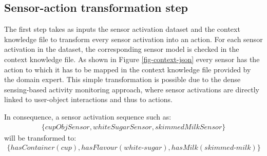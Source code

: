 

\subsection{Sensor-action transformation step}
\label{subsec:clustering:sa3:transform}

The first step takes as inputs the sensor activation dataset and the context knowledge file to transform every sensor activation into an action. For each sensor activation in the dataset, the corresponding sensor model is checked in the context knowledge file. As shown in Figure \ref{fig-context-json} every sensor has the action to which it has to be mapped in the context knowledge file provided by the domain expert. This simple transformation is possible due to the dense sensing-based activity monitoring approach, where sensor activations are directly linked to user-object interactions and thus to actions. 

In consequence, a sensor activation sequence such as:
 \begin{equation*}
 \begin{split}
   \{cupObjSensor, whiteSugarSensor, skimmedMilkSensor\}
 \end{split}  
 \end{equation*}
 will be transformed to:
 \begin{equation*}
 \begin{split}
  \{hasContainer(cup), hasFlavour(white\text{-}sugar), hasMilk(skimmed\text{-}milk)\}
 \end{split}   
 \end{equation*}
 
